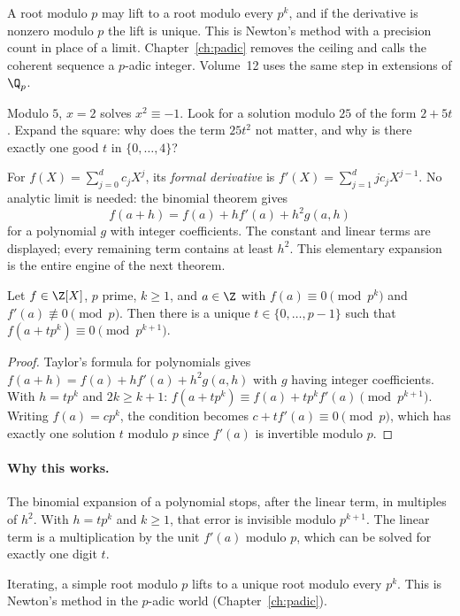 A root modulo $p$ may lift to a root modulo every $p^k$, and if the derivative is nonzero modulo $p$ the lift is unique. This is Newton's method with a precision count in place of a limit. Chapter~\ref{ch:padic} removes the ceiling and calls the coherent sequence a $p$-adic integer. Volume~12 uses the same step in extensions of $\Q_p$.

\begin{think}
Modulo $5$, $x=2$ solves $x^2\equiv-1$. Look for a solution modulo $25$ of the form $2+5t$. Expand the square: why does the term $25t^2$ not matter, and why is there exactly one good $t$ in $\{0,\dots,4\}$?
\end{think}

For $f(X)=\sum_{j=0}^d c_jX^j$, its \emph{formal derivative} is $f'(X)=\sum_{j=1}^d jc_jX^{j-1}$. No analytic limit is needed: the binomial theorem gives
\[
f(a+h)=f(a)+hf'(a)+h^2g(a,h)
\]
for a polynomial $g$ with integer coefficients. The constant and linear terms are displayed; every remaining term contains at least $h^2$. This elementary expansion is the entire engine of the next theorem.

\begin{theorem}\label{thm:hensel}
Let $f\in\Z[X]$, $p$ prime, $k\ge1$, and $a\in\Z$ with $f(a)\equiv0\pmod{p^k}$ and $f'(a)\not\equiv0\pmod p$. Then there is a unique $t\in\{0,\dots,p-1\}$ such that $f(a+tp^k)\equiv0\pmod{p^{k+1}}$.
\end{theorem}
\begin{proof}
Taylor's formula for polynomials gives $f(a+h)=f(a)+hf'(a)+h^2g(a,h)$ with $g$ having integer coefficients. With $h=tp^k$ and $2k\ge k+1$:
$f(a+tp^k)\equiv f(a)+tp^kf'(a)\pmod{p^{k+1}}$. Writing $f(a)=cp^k$, the condition becomes $c+tf'(a)\equiv0\pmod p$, which has exactly one solution $t$ modulo $p$ since $f'(a)$ is invertible modulo $p$.
\end{proof}

\paragraph{Why this works.}
The binomial expansion of a polynomial stops, after the linear term, in multiples of $h^2$. With $h=tp^k$ and $k\ge 1$, that error is invisible modulo $p^{k+1}$. The linear term is a multiplication by the unit $f'(a)$ modulo $p$, which can be solved for exactly one digit $t$.

Iterating, a simple root modulo $p$ lifts to a unique root modulo every $p^k$. This is Newton's method in the $p$-adic world (Chapter~\ref{ch:padic}).

